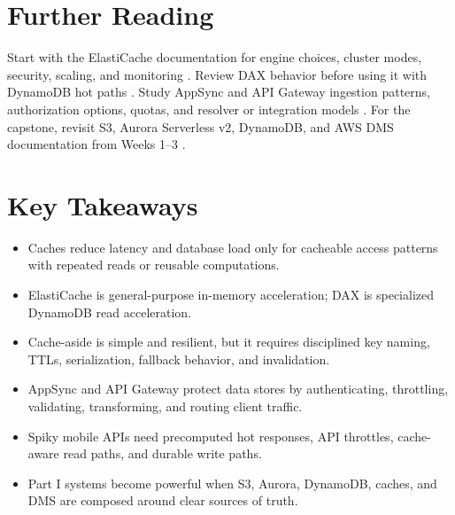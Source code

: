\section{Further Reading}
Start with the ElastiCache documentation for engine choices, cluster modes, security, scaling, and monitoring \cite{awsElastiCacheUserGuide}. Review DAX behavior before using it with DynamoDB hot paths \cite{awsDynamoDBDAX}. Study AppSync and API Gateway ingestion patterns, authorization options, quotas, and resolver or integration models \cite{awsAppSyncDeveloperGuide,awsAPIGatewayDeveloperGuide}. For the capstone, revisit S3, Aurora Serverless v2, DynamoDB, and AWS DMS documentation from Weeks 1--3 \cite{awsS3UserGuide,awsAuroraServerlessV2,awsDynamoDBDeveloperGuide,awsDMSUserGuide}.
\section*{Key Takeaways}
\begin{itemize}
    \item Caches reduce latency and database load only for cacheable access patterns with repeated reads or reusable computations.
    \item ElastiCache is general-purpose in-memory acceleration; DAX is specialized DynamoDB read acceleration.
    \item Cache-aside is simple and resilient, but it requires disciplined key naming, TTLs, serialization, fallback behavior, and invalidation.
    \item AppSync and API Gateway protect data stores by authenticating, throttling, validating, transforming, and routing client traffic.
    \item Spiky mobile APIs need precomputed hot responses, API throttles, cache-aware read paths, and durable write paths.
    \item Part I systems become powerful when S3, Aurora, DynamoDB, caches, and DMS are composed around clear sources of truth.
\end{itemize}

